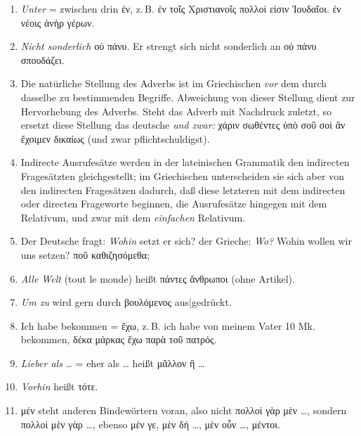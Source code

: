 \begin{enumerate}[leftmargin=0pt,rightmargin=0pt,listparindent =1cm,labelindent=1cm,labelsep=1ex,labelwidth={*},itemindent={*},align=left]
\item \emph{Unter} = zwischen drin \textgreek[variant=ancient]{ἐν,} z.\,B.
\textgreek[variant=ancient]{ἐν τοῖς Χριστιανοῖς πολλοί εἰσιν Ἰουδαῖοι.
ἐν νέοις ἀνὴρ γέρων.}
\item \emph{Nicht sonderlich} \textgreek[variant=ancient]{οὐ πάνυ.} Er strengt
sich nicht sonderlich an \textgreek[variant=ancient]{οὐ πάνυ σπουδάζει.}
\item Die natürliche Stellung des Adverbs ist im Griechischen \emph{vor}
dem durch dasselbe zu bestimmenden Begriffe. Abweichung von dieser
Stellung dient zur Hervorhebung des Adverbs. Steht das Adverb mit
Nachdruck zuletzt, so ersetzt diese Stellung das deutsche \emph{und
zwar:} \textgreek[variant=ancient]{χάριν σωθέντες ὑπὸ σοῦ σοὶ ἂν ἔχοιμεν
δικαίως} (und zwar pflichtschuldigst). 
\item Indirecte Ausrufesätze werden in der lateinischen Grammatik den indirecten
Fragesätzten gleichgestellt; im Griechischen unterscheiden sie sich
aber von den indirecten Fragesätzen dadurch, daß diese letzteren mit
dem indirecten oder directen Frageworte beginnen, die Ausrufesätze
hingegen mit dem Relativum, und zwar mit dem \emph{einfachen} Relativum.
\item Der Deutsche fragt: \emph{Wohin} setzt er sich? der Grieche: \emph{Wo?}
Wohin wollen wir uns setzen? \textgreek[variant=ancient]{ποῦ καθιζησόμεθα;}
\item \emph{Alle Welt} \textfrench{(tout le monde)} heißt \textgreek[variant=ancient]{πάντες
ἄνθρωποι} (ohne Artikel).
\item \emph{Um zu} wird gern durch \textgreek[variant=ancient]{βουλόμενος}
aus|gedrückt.
\item Ich habe bekommen = \textgreek[variant=ancient]{ἔχω,} z.\,B. ich habe
von meinem Vater 10 Mk. bekommen, \textgreek[variant=ancient]{δέκα
μάρκας ἔχω παρὰ τοῦ πατρός.}
\item \emph{Lieber als} \ldots{} = eher als \ldots{} heißt \textgreek[variant=ancient]{μᾶλλον
ἢ }\ldots{}
\item \emph{Vorhin} heißt \textgreek[variant=ancient]{τότε.} 
\item \textgreek[variant=ancient]{μέν} steht anderen Bindewörtern voran,
also nicht \textgreek[variant=ancient]{πολλοὶ γὰρ μὲν }\ldots{}\textgreek[variant=ancient]{,}
sondern \textgreek[variant=ancient]{πολλοὶ μὲν γὰρ }\ldots{}\textgreek[variant=ancient]{,}
ebenso \textgreek[variant=ancient]{μέν γε, μὲν δή }\ldots{}\textgreek[variant=ancient]{,
μὲν οὖν }\ldots{}\textgreek[variant=ancient]{, μέντοι.}

\end{enumerate}
